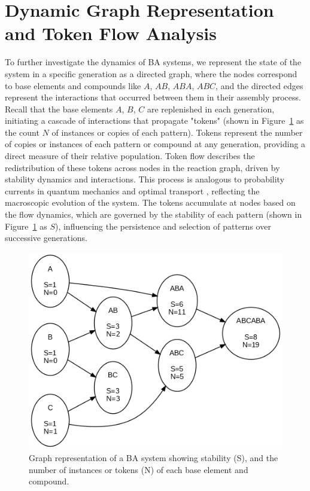 \documentclass[entropy,article,submit,pdftex,moreauthors]{Definitions/mdpi}
\begin{document}
\section{Dynamic Graph Representation and Token Flow Analysis}

To further investigate the dynamics of BA systems, we represent the state of the system in a specific generation as a directed graph, where the nodes correspond to base elements and compounds like $A$, $AB$, $ABA$, $ABC$, and the directed edges represent the interactions that occurred between them in their assembly process. Recall that the base elements $A$, $B$, $C$ are replenished in each generation, initiating a cascade of interactions that propagate "tokens" (shown in Figure~\ref{fig:abc_sim} as the count $N$ of instances or copies of each pattern). Tokens represent the number of copies or instances of each pattern or compound at any generation, providing a direct measure of their relative population. Token flow describes the redistribution of these tokens across nodes in the reaction graph, driven by stability dynamics and interactions. This process is analogous to probability currents in quantum mechanics \cite{feynman1965quantum} and optimal transport \cite{villani2008optimal}, reflecting the macroscopic evolution of the system. The tokens accumulate at nodes based on the flow dynamics, which are governed by the stability of each pattern (shown in Figure~\ref{fig:abc_sim} as $S$), influencing the persistence and selection of patterns over successive generations.


\begin{figure}[h]
    \centering
    \includegraphics[width=0.7\linewidth]{abc_graph.png}
    \caption{Graph representation of a BA system showing stability (S), and the number of instances or tokens (N) of each base element and compound.}
    \label{fig:abc_sim}
\end{figure}
\end{document}
